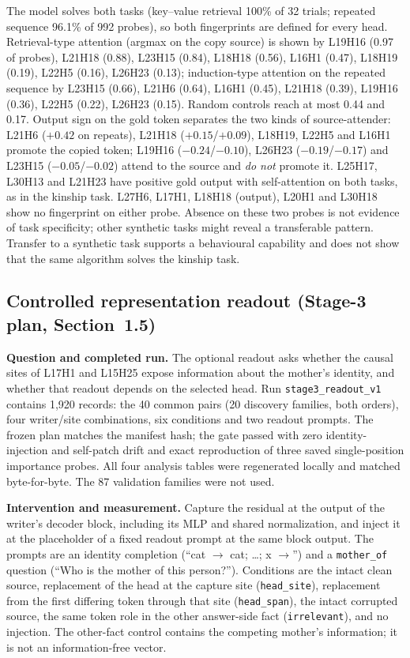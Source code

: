 \documentclass[11pt,a4paper]{article}
\begin{document}
The model solves both tasks (key--value retrieval 100\% of 32 trials; repeated
sequence 96.1\% of 992 probes), so both fingerprints are defined for every head.
Retrieval-type attention (argmax on the copy source) is shown by L19H16 (0.97 of
probes), L21H18 (0.88), L23H15 (0.84), L18H18 (0.56), L16H1 (0.47), L18H19 (0.19),
L22H5 (0.16), L26H23 (0.13); induction-type attention on the repeated sequence by
L23H15 (0.66), L21H6 (0.64), L16H1 (0.45), L21H18 (0.39), L19H16 (0.36), L22H5
(0.22), L26H23 (0.15). Random controls reach at most 0.44 and 0.17. Output sign on the
gold token separates the two kinds of source-attender: L21H6 ($+0.42$ on repeats),
L21H18 ($+0.15$/$+0.09$), L18H19, L22H5 and L16H1 promote the copied token; L19H16
($-0.24$/$-0.10$), L26H23 ($-0.19$/$-0.17$) and L23H15 ($-0.05$/$-0.02$) attend to
the source and \emph{do not} promote it. L25H17, L30H13 and L21H23 have positive gold
output with self-attention on both tasks, as in the kinship task. L27H6, L17H1, L18H18
(output), L20H1 and L30H18 show no fingerprint on either probe. Absence on these two
probes is not evidence of task specificity; other synthetic tasks might reveal a
transferable pattern. Transfer to a synthetic task supports a behavioural
capability and does not show that the same algorithm solves the kinship task.

\subsection{Controlled representation readout (Stage-3 plan, Section~1.5)}
\label{sec:readout}
\textbf{Question and completed run.} The optional readout asks whether the causal
sites of L17H1 and L15H25 expose information about the mother's identity, and whether
that readout depends on the selected head. Run \texttt{stage3\_readout\_v1} contains
1{,}920 records: the 40 common pairs (20 discovery families, both orders), four
writer/site combinations, six conditions and two readout prompts. The frozen plan
matches the manifest hash; the gate passed with zero identity-injection and self-patch
drift and exact reproduction of three saved single-position importance probes. All
four analysis tables were regenerated locally and matched byte-for-byte. The 87
validation families were not used.

\textbf{Intervention and measurement.} Capture the residual at the output of the
writer's decoder block, including its MLP and shared normalization, and inject it at
the placeholder of a fixed readout prompt at the same block output. The prompts are
an identity completion (``cat $\to$ cat; \ldots; x $\to$'') and a
\texttt{mother\_of} question (``Who is the mother of this person?''). Conditions are
the intact clean source, replacement of the head at the capture site
(\texttt{head\_site}), replacement from the first differing token through that site
(\texttt{head\_span}), the intact corrupted source, the same token role in the other
answer-side fact (\texttt{irrelevant}), and no injection. The other-fact control
contains the competing mother's information; it is not an information-free vector.
\end{document}
